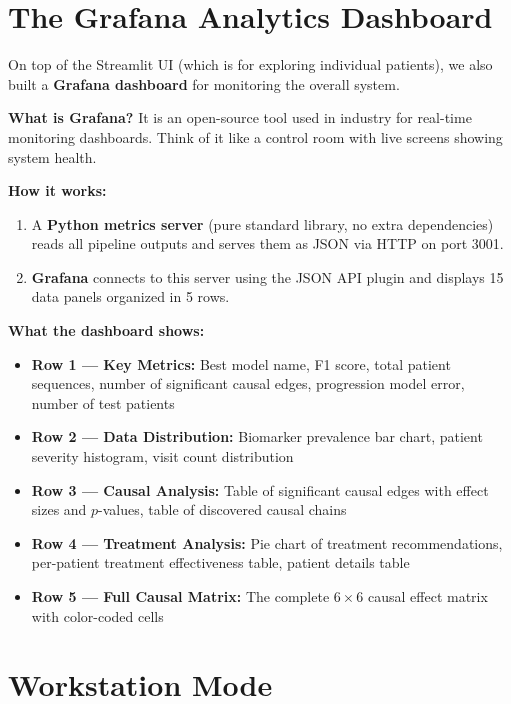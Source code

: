 \documentclass[12pt,a4paper]{article}
\begin{document}
\section{The Grafana Analytics Dashboard}

On top of the Streamlit UI (which is for exploring individual patients), we also built a \textbf{Grafana dashboard} for monitoring the overall system.

\textbf{What is Grafana?} It is an open-source tool used in industry for real-time monitoring dashboards. Think of it like a control room with live screens showing system health.

\textbf{How it works:}
\begin{enumerate}[nosep]
  \item A \textbf{Python metrics server} (pure standard library, no extra dependencies) reads all pipeline outputs and serves them as JSON via HTTP on port 3001.
  \item \textbf{Grafana} connects to this server using the JSON API plugin and displays 15 data panels organized in 5 rows.
\end{enumerate}

\textbf{What the dashboard shows:}
\begin{itemize}[nosep]
  \item \textbf{Row 1 --- Key Metrics:} Best model name, F1 score, total patient sequences, number of significant causal edges, progression model error, number of test patients
  \item \textbf{Row 2 --- Data Distribution:} Biomarker prevalence bar chart, patient severity histogram, visit count distribution
  \item \textbf{Row 3 --- Causal Analysis:} Table of significant causal edges with effect sizes and $p$-values, table of discovered causal chains
  \item \textbf{Row 4 --- Treatment Analysis:} Pie chart of treatment recommendations, per-patient treatment effectiveness table, patient details table
  \item \textbf{Row 5 --- Full Causal Matrix:} The complete $6 \times 6$ causal effect matrix with color-coded cells
\end{itemize}


\section{Workstation Mode}
\end{document}
